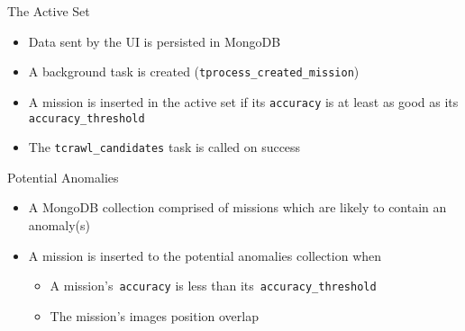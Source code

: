 \begin{frame}{The Active Set}
    \begin{itemize}
        \item Data sent by the UI is persisted in MongoDB
        \item A background task is created (\texttt{tprocess\_created\_mission})
        \item A mission is inserted in the active set if its \texttt{accuracy} is at least as good as its \texttt{accuracy\_threshold}
        \item The \texttt{tcrawl\_candidates} task is called on success
    \end{itemize}
\end{frame}

\begin{frame}{Potential Anomalies}
    \begin{itemize}
        \item A MongoDB collection comprised of missions which are likely to contain an anomaly(s)
        \item A mission is inserted to the potential anomalies collection when 
            \begin{itemize}
                \item A mission's~\texttt{accuracy} is less than its~\texttt{accuracy\_threshold} 
                \item The mission's images position overlap
            \end{itemize}
    \end{itemize}
\end{frame}


